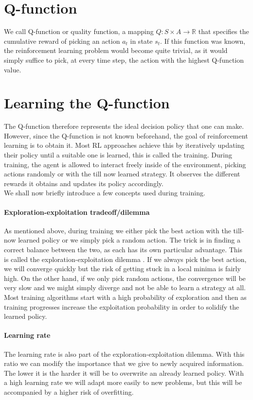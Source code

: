  \section{Q-function}
 We call Q-function or quality function, a mapping $Q:S \times A \rightarrow \mathbb{R}$ that specifies the cumulative reward of picking an action $a_t$ in state $s_t$. If this function was known, the reinforcement learning problem would become quite trivial, as it would simply suffice to pick, at every time step, the action with the highest Q-function value.
 
 \section{Learning the Q-function} 
The Q-function therefore represents the ideal decision policy that one can make. However, since the Q-function is not known beforehand, the goal of reinforcement learning is to obtain it. Most RL approaches achieve this by iteratively updating their policy until a suitable one is learned, this is called the training. During training, the agent is allowed to interact freely inside of the environment, picking actions randomly or with the till now learned strategy. It observes the different rewards it obtains and updates its policy accordingly.\\ 
We shall now briefly introduce a few concepts used during training.
\paragraph{Exploration-exploitation tradeoff/dilemma}
As mentioned above, during training we either pick the best action with the till-now learned policy or we simply pick a random action. The trick is in finding a correct balance between the two, as each has its own particular advantage. This is called the exploration-exploitation dilemma \cite{yogeswaran2012reinforcement}. If we always pick the best action, we will converge quickly but the risk of getting stuck in a local minima is fairly high. On the other hand, if we only pick random actions, the convergence will be very slow and we might simply diverge and not be able to learn a strategy at all. Most training algorithms start with a high probability of exploration and then as training progresses increase the exploitation probability in order to solidify the learned policy.
\paragraph{Learning rate}
The learning rate is also part of the exploration-exploitation dilemma. With this ratio we can modify the importance that we give to newly acquired information. The lower it is the harder it will be to overwrite an already learned policy. With a high learning rate we will adapt more easily to new problems, but this will be accompanied by a higher risk of overfitting.

